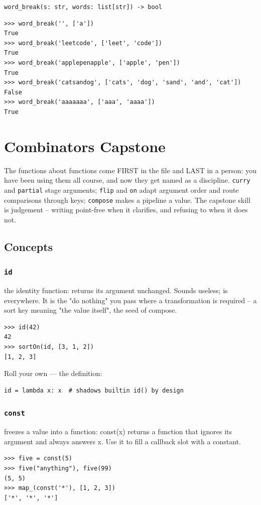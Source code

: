 \documentclass[10pt,letterpaper]{book}
\begin{document}
\noindent\texttt{word\_break(s: str, words: list[str]) -> bool}
\begin{lstlisting}[style=ex]
>>> word_break('', ['a'])
True
>>> word_break('leetcode', ['leet', 'code'])
True
>>> word_break('applepenapple', ['apple', 'pen'])
True
>>> word_break('catsandog', ['cats', 'dog', 'sand', 'and', 'cat'])
False
>>> word_break('aaaaaaa', ['aaa', 'aaaa'])
True
\end{lstlisting}
\clearpage
\chapter{Combinators Capstone}

The functions about functions come FIRST in the file and LAST in a person:
you have been using them all course, and now they get named as a
discipline. \texttt{curry} and \texttt{partial} stage arguments;
\texttt{flip} and \texttt{on} adapt argument order and route comparisons
through keys; \texttt{compose} makes a pipeline a value. The capstone skill
is judgement -- writing point-free when it clarifies, and refusing to when
it does not.
\section{Concepts}
\subsection{\texttt{id}}\label{def:id}
the identity function: returns its argument unchanged. Sounds useless; is everywhere. It is the "do nothing" you pass where a transformation is required -- a sort key meaning "the value itself", the seed of compose.
\begin{lstlisting}[style=ex]
>>> id(42)
42
>>> sortOn(id, [3, 1, 2])
[1, 2, 3]
\end{lstlisting}

Roll your own --- the definition:

\begin{lstlisting}[style=ex]
id = lambda x: x  # shadows builtin id() by design
\end{lstlisting}
\subsection{\texttt{const}}\label{def:const}
freezes a value into a function: const(x) returns a function that ignores its argument and always answers x. Use it to fill a callback slot with a constant.
\begin{lstlisting}[style=ex]
>>> five = const(5)
>>> five("anything"), five(99)
(5, 5)
>>> map_(const('*'), [1, 2, 3])
['*', '*', '*']
\end{lstlisting}
\end{document}
